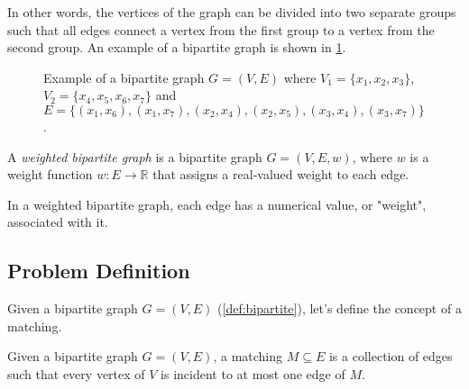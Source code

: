 In other words, the vertices of the graph can be divided into two separate groups such that all edges connect a vertex from the first group to a vertex from the second group. An example of a bipartite graph is shown in \cref{fig:bipartite_graph_example}.

\begin{figure}[H]
    \centering
    \caption[Example of a bipartite graph]{Example of a bipartite graph $G=(V, E)$ where $V_1=\{x_1,x_2,x_3\}$, $V_2=\{x_4,x_5,x_6,x_7\}$ and $E=\{(x_1,x_6),(x_1,x_7),(x_2,x_4),(x_2,x_5),(x_3,x_4),(x_3,x_7)\}$.}
    \label{fig:bipartite_graph_example}
\end{figure}

\begin{definition} \label{def:weighted_bipartite}
    A \textit{weighted bipartite graph} is a bipartite graph $G=(V, E, w)$, where $w$ is a weight function $w: E \to \mathbb{R}$ that assigns a real-valued weight to each edge.
\end{definition}

In a weighted bipartite graph, each edge has a numerical value, or "weight", associated with it.

\subsection{Problem Definition}
Given a bipartite graph $G = (V, E)$ (\cref{def:bipartite}), let's define the concept of a matching. 

\begin{definition}[Matching] \label{def:matching}
    Given a bipartite graph $G = (V, E)$, a matching $M \subseteq E$ is a collection of edges such that every vertex of $V$ is incident to at most one edge of $M$.
\end{definition}

